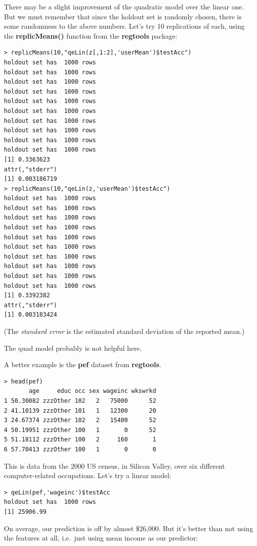 There may be a slight improvement of the quadratic model over the linear
one.  But we must remember that since the holdout set is randomly
chosen, there is some randomness to the above numbers.  Let's try 10
replications of each, using the \textbf{replicMeans()} function from the
\textbf{regtools} package:

\begin{lstlisting}
> replicMeans(10,"qeLin(z[,1:2],'userMean')$testAcc")
holdout set has  1000 rows
holdout set has  1000 rows
holdout set has  1000 rows
holdout set has  1000 rows
holdout set has  1000 rows
holdout set has  1000 rows
holdout set has  1000 rows
holdout set has  1000 rows
holdout set has  1000 rows
holdout set has  1000 rows
[1] 0.3363623
attr(,"stderr")
[1] 0.003186719
> replicMeans(10,"qeLin(z,'userMean')$testAcc")
holdout set has  1000 rows
holdout set has  1000 rows
holdout set has  1000 rows
holdout set has  1000 rows
holdout set has  1000 rows
holdout set has  1000 rows
holdout set has  1000 rows
holdout set has  1000 rows
holdout set has  1000 rows
holdout set has  1000 rows
[1] 0.3392382
attr(,"stderr")
[1] 0.003183424
\end{lstlisting}

(The \textit{standard error} is the estimated standard deviation of the
reported mean.)

The quad model probably is not helpful here.

A better example is the \textbf{pef} dataset from \textbf{regtools}.

\begin{lstlisting}
> head(pef)
       age     educ occ sex wageinc wkswrkd
1 50.30082 zzzOther 102   2   75000      52
2 41.10139 zzzOther 101   1   12300      20
3 24.67374 zzzOther 102   2   15400      52
4 50.19951 zzzOther 100   1       0      52
5 51.18112 zzzOther 100   2     160       1
6 57.70413 zzzOther 100   1       0       0
\end{lstlisting}

This is data from the 2000 US census, in Silicon Valley, over six
different computer-related occupations.  Let's try a linear model:

\begin{lstlisting}
> qeLin(pef,'wageinc')$testAcc
holdout set has  1000 rows
[1] 25906.99
\end{lstlisting}

On average, our prediction is off by almost \$26,000.  But it's better
than not using the features at all, i.e.\ just using mean income as our
predictor:

